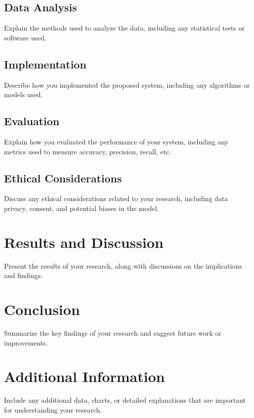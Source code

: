 \documentclass[12pt]{report}
\begin{document}
\section{Data Analysis}
Explain the methods used to analyze the data, including any statistical tests or software used.
\section{Implementation}
Describe how you implemented the proposed system, including any algorithms or models used.
\section{Evaluation}
Explain how you evaluated the performance of your system, including any metrics used to measure accuracy, precision, recall, etc.
\section{Ethical Considerations}
Discuss any ethical considerations related to your research, including data privacy, consent, and potential biases in the model.

\newpage
\chapter{Results and Discussion}
Present the results of your research, along with discussions on the implications and findings.

\chapter{Conclusion}
Summarize the key findings of your research and suggest future work or improvements.

\newpage
\sloppy
\printbibliography
\newpage

\appendix
\chapter{Additional Information}
Include any additional data, charts, or detailed explanations that are important for understanding your research.
\end{document}
